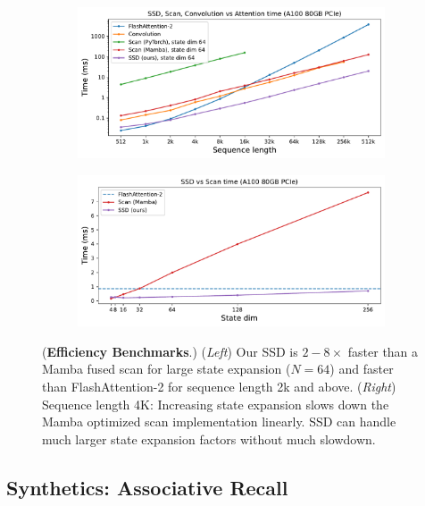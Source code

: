\begin{figure}[!ht]
  \centering
  \begin{subfigure}{.5\textwidth}
    \centering
    \includegraphics[width=.95\linewidth]{fig/ssm_ssd.pdf}
  \end{subfigure}%
  \begin{subfigure}{.5\textwidth}
    \centering
    \includegraphics[width=.95\linewidth]{fig/ssm_ssd_dstate.pdf}
  \end{subfigure}
  \caption{
    (\textbf{Efficiency Benchmarks}.)
    (\emph{Left}) Our SSD is $2-8\times$ faster than a Mamba fused scan for large state expansion ($N = 64$) and faster than FlashAttention-2 for sequence length 2k and above.
    (\emph{Right}) Sequence length 4K: Increasing state expansion slows down the Mamba optimized scan implementation linearly. SSD can handle much larger state expansion factors without much slowdown.
    \iftoggle{arxiv}{}{\vspace*{-0.75em}}
  }
  \label{fig:scan_benchmark}
\end{figure}



\subsection{Synthetics: Associative Recall}
\label{sec:experiments:mqar}

